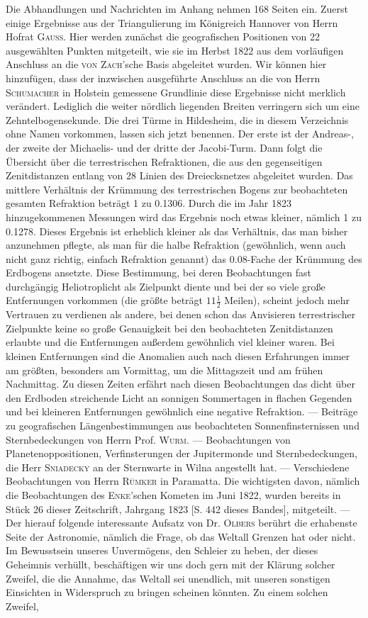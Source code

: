 Die Abhandlungen und Nachrichten im Anhang nehmen 168 Seiten ein. Zuerst einige Ergebnisse aus der Triangulierung im Königreich Hannover von Herrn Hofrat \textsc{Gauss}. Hier werden zunächst die geografischen Positionen von 22 ausgewählten Punkten mitgeteilt, wie sie im Herbst 1822 aus dem vorläufigen Anschluss an die \textsc{von Zach}'sche Basis abgeleitet wurden. Wir können hier hinzufügen, dass der inzwischen ausgeführte Anschluss an die von Herrn \textsc{Schumacher} in Holstein gemessene Grundlinie diese Ergebnisse nicht merklich verändert. Lediglich die weiter nördlich liegenden Breiten verringern sich um eine Zehntelbogensekunde. Die drei Türme in Hildesheim, die in diesem Verzeichnis ohne Namen vorkommen, lassen sich jetzt benennen. Der erste ist der Andreas-, der zweite der Michaelis- und der dritte der Jacobi-Turm. Dann folgt die Übersicht über die terrestrischen Refraktionen, die aus den gegenseitigen Zenitdistanzen entlang von 28 Linien des Dreiecksnetzes abgeleitet wurden. Das mittlere Verhältnis der Krümmung des terrestrischen Bogens zur beobachteten gesamten Refraktion beträgt 1 zu 0.1306. Durch die im Jahr 1823 hinzugekommenen Messungen wird das Ergebnis noch etwas kleiner, nämlich 1 zu 0.1278. Dieses Ergebnis ist erheblich kleiner als das Verhältnis, das man bisher anzunehmen pflegte, als man für die halbe Refraktion (gewöhnlich, wenn auch nicht ganz richtig, einfach Refraktion genannt) das 0.08-Fache der Krümmung des Erdbogens ansetzte. Diese Bestimmung, bei deren Beobachtungen fast durchgängig Heliotroplicht als Zielpunkt diente und bei der so viele große Entfernungen vorkommen (die größte beträgt $11\tfrac{1}{2}$ Meilen), scheint jedoch mehr Vertrauen zu verdienen als andere, bei denen schon das Anvisieren terrestrischer Zielpunkte keine so große Genauigkeit bei den beobachteten Zenitdistanzen erlaubte und die Entfernungen außerdem gewöhnlich viel kleiner waren. Bei kleinen Entfernungen sind die Anomalien auch nach diesen Erfahrungen immer am größten, besonders am Vormittag, um die Mittagszeit und am frühen Nachmittag. Zu diesen Zeiten erfährt nach diesen Beobachtungen das dicht über den Erdboden streichende Licht an sonnigen Sommertagen in flachen Gegenden und bei kleineren Entfernungen gewöhnlich eine negative Refraktion. --- Beiträge zu geografischen Längenbestimmungen aus beobachteten Sonnenfinsternissen und Sternbedeckungen von Herrn Prof. \textsc{Wurm}. --- Beobachtungen von Planetenoppositionen, Verfinsterungen der Jupitermonde und Sternbedeckungen, die Herr \textsc{Sniadecky} an der Sternwarte in Wilna angestellt hat. --- Verschiedene Beobachtungen von Herrn \textsc{Rümker} in Paramatta. Die wichtigsten davon, nämlich die Beobachtungen des \textsc{Enke}'schen Kometen im Juni 1822, wurden bereits in Stück 26 dieser Zeitschrift, Jahrgang 1823 [S. 442 dieses Bandes], mitgeteilt. --- Der hierauf folgende interessante Aufsatz von Dr. \textsc{Olbers} berührt die erhabenste Seite der Astronomie, nämlich die Frage, ob das Weltall Grenzen hat oder nicht. Im Bewusstsein unseres Unvermögens, den Schleier zu heben, der dieses Geheimnis verhüllt, beschäftigen wir uns doch gern mit der Klärung solcher Zweifel, die die Annahme, das Weltall sei unendlich, mit unseren sonstigen Einsichten in Widerspruch zu bringen scheinen könnten. Zu einem solchen Zweifel, 